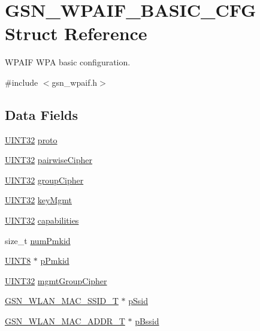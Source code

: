 \hypertarget{a00420}{
\section{GSN\_\-WPAIF\_\-BASIC\_\-CFG Struct Reference}
\label{a00420}
}


WPAIF WPA basic configuration.  




{\ttfamily \#include $<$gsn\_\-wpaif.h$>$}

\subsection*{Data Fields}
\begin{DoxyCompactItemize}
\item 
\hyperlink{a00660_gae1e6edbbc26d6fbc71a90190d0266018}{UINT32} \hyperlink{a00420_afbcc3671133d081aa615d5bf4985d90a}{proto}
\item 
\hyperlink{a00660_gae1e6edbbc26d6fbc71a90190d0266018}{UINT32} \hyperlink{a00420_ae91ce7434d7369622c34d00fb0a2356f}{pairwiseCipher}
\item 
\hyperlink{a00660_gae1e6edbbc26d6fbc71a90190d0266018}{UINT32} \hyperlink{a00420_a5ec68df5277949030e6a5438cd4227a8}{groupCipher}
\item 
\hyperlink{a00660_gae1e6edbbc26d6fbc71a90190d0266018}{UINT32} \hyperlink{a00420_ad4fe2089d827eafc0079062d4c169273}{keyMgmt}
\item 
\hyperlink{a00660_gae1e6edbbc26d6fbc71a90190d0266018}{UINT32} \hyperlink{a00420_a0a6ef5c242a65361e9f85781f02fb006}{capabilities}
\item 
size\_\-t \hyperlink{a00420_a36db0b0cd5b9faca4d057d60ee67bf80}{numPmkid}
\item 
\hyperlink{a00660_gab27e9918b538ce9d8ca692479b375b6a}{UINT8} $\ast$ \hyperlink{a00420_a6c19c71297a0530d3d5e316108388183}{pPmkid}
\item 
\hyperlink{a00660_gae1e6edbbc26d6fbc71a90190d0266018}{UINT32} \hyperlink{a00420_ada5e16e11e79d6ab0644d50c6363ca8e}{mgmtGroupCipher}
\item 
\hyperlink{a00417}{GSN\_\-WLAN\_\-MAC\_\-SSID\_\-T} $\ast$ \hyperlink{a00420_a6a1883676a18cb604743e02caaf42968}{pSsid}
\item 
\hyperlink{a00416}{GSN\_\-WLAN\_\-MAC\_\-ADDR\_\-T} $\ast$ \hyperlink{a00420_a42f232a04e00fddff8a2479c3dc686e2}{pBssid}
\end{DoxyCompactItemize}


